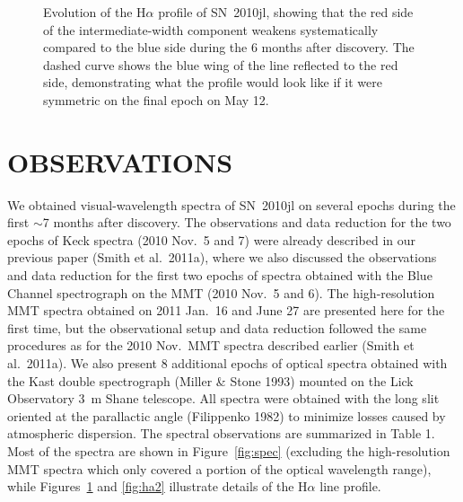 \documentclass{emulateapj}
\begin{document}
\begin{figure}
\caption{Evolution of the H$\alpha$ profile of SN~2010jl, showing that
  the red side of the intermediate-width component weakens
  systematically compared to the blue side during the 6 months after
  discovery.  The dashed curve shows the blue wing of the line
  reflected to the red side, demonstrating what the profile would look
  like if it were symmetric on the final epoch on May 12.}
\label{fig:ha}
\end{figure}

\section{OBSERVATIONS}


We obtained visual-wavelength spectra of SN~2010jl on several epochs
during the first $\sim$7 months after discovery.  The observations and
data reduction for the two epochs of Keck spectra (2010 Nov.\ 5 and 7)
were already described in our previous paper (Smith et al.\ 2011a),
where we also discussed the observations and data reduction for the
first two epochs of spectra obtained with the Blue Channel spectrograph
on the MMT (2010 Nov.\ 5 and 6).  The high-resolution MMT spectra
obtained on 2011 Jan.\ 16 and June 27 are presented here for the first
time, but the observational setup and data reduction followed the same
procedures as for the 2010 Nov.\ MMT spectra described earlier (Smith et
al.\ 2011a).  We also present 8 additional epochs of optical spectra
obtained with the Kast double spectrograph (Miller \& Stone 1993)
mounted on the Lick Observatory 3~m Shane telescope.  All spectra were
obtained with the long slit oriented at the parallactic angle
(Filippenko 1982) to minimize losses caused by atmospheric dispersion.
The spectral observations are summarized in Table 1.  Most of the
spectra are shown in Figure~\ref{fig:spec} (excluding the
high-resolution MMT spectra which only covered a portion of the
optical wavelength range), while Figures~\ref{fig:ha} and
\ref{fig:ha2} illustrate details of the H$\alpha$ line profile.
\end{document}
